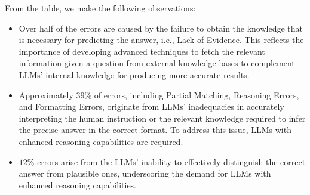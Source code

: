 From the table, we make the following observations:
\begin{itemize}
    \item  Over half of the errors are caused by the failure to obtain the knowledge that is necessary for predicting the answer, i.e., Lack of Evidence. This reflects the importance of developing advanced techniques to fetch the relevant information given a question from external knowledge bases to complement LLMs' internal knowledge for producing more accurate results.
    \item Approximately $39\%$ of errors, including Partial Matching, Reasoning Errors, and Formatting Errors, originate from LLMs' inadequacies in accurately interpreting the human instruction or the relevant knowledge required to infer the precise answer in the correct format. To address this issue, LLMs with enhanced reasoning capabilities are required.  
    \item $12\%$ errors arise from the LLMs' inability to effectively distinguish the correct answer from plausible ones, underscoring the demand for LLMs with enhanced reasoning capabilities. 
\end{itemize}

